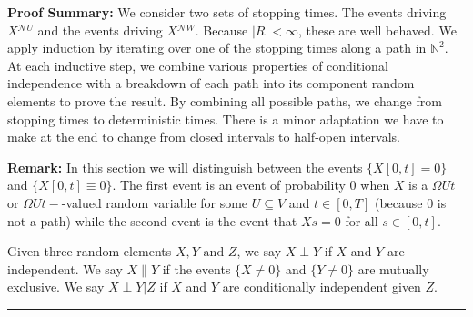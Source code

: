 \documentclass[12pt]{article}
\newcommand{\skipLine}{\vspace{12pt}}
\newcommand{\mb}{\mathbb}
\newcommand{\mc}{\mathcal}
\newcommand{\te}{\text}
\newcommand{\pfsum}{\textbf{Proof Summary: }}
\newcommand{\ind}{\hspace{24pt}}
\newcommand{\lin}{\rule{\linewidth}{0.4 pt}}
\renewcommand{\U}{U}							%
\newcommand{\UU}{W}								%
\newcommand{\UUU}{R}							%
\newcommand{\T}{T}								%
\renewcommand{\t}{t}							%
\renewcommand{\tt}{s}							%
\newcommand{\X}{X}								%
\newcommand{\neigh}{\mc{N}}						%
\newcommand{\XX}{Y}								%
\newcommand{\XXX}{Z}							%
\newcommand{\mutex}{\|}							%
\begin{document}
\pfsum We consider two sets of stopping times. The events driving \(\X{}{}^{\neigh{\U}}\) and the events driving \(\X{}{}^{\neigh{\UU}}\). Because \(|\UUU| < \infty\), these are well behaved. We apply induction by iterating over one of the stopping times along a path in \(\mb{N}^2\). At each inductive step, we combine various properties of conditional independence with a breakdown of each path into its component random elements to prove the result. By combining all possible paths, we change from stopping times to deterministic times. There is a minor adaptation we have to make at the end to change from closed intervals to half-open intervals.

\skipLine

\textbf{Remark:} In this section we will distinguish between the events \(\{\X{}{[0,\t]} = 0\}\) and \(\{\X{}{[0,\t]}\equiv 0\}\). The first event is an event of probability 0 when \(\X{}{}\) is a \(\Omega{\U}{\t}\) or \(\Omega{\U}{\t-}\)-valued random variable for some \(\U\subseteq V\) and \(\t \in [0,\T]\) (because 0 is not a path) while the second event is the event that \(\X{}{\tt} = 0\) for all \(\tt \in [0,\t]\).

\ind Given three random elements \(\X{}{},\XX{}{} \te{ and } \XXX{}{}\), we say \(\X{}{}\perp \XX{}{}\) if \(\X{}{}\) and \(\XX{}{}\) are independent. We say \(\X{}{}\mutex \XX{}{}\) if the events \(\{\X{}{}\neq 0\}\) and \(\{\XX{}{} \neq 0\}\) are mutually exclusive. We say \(\X{}{}\perp \XX{}{}|\XXX{}{}\) if \(\X{}{}\) and \(\XX{}{}\) are conditionally independent given \(\XXX{}{}\).

\lin
\end{document}
